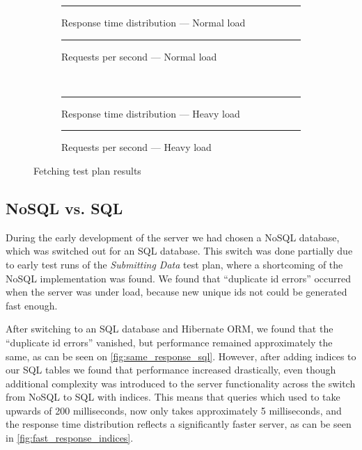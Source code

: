 \begin{figure}[!htb]
    \centering
    \begin{subfigure}[b]{0.5\textwidth}
        \centering
        \rule{5cm}{5cm}
        \caption{Response time distribution --- Normal load}\label{fig:fetch_resp_t_dist}
    \end{subfigure}\hfill%
    \begin{subfigure}[b]{0.5\textwidth}
        \centering
        \rule{5cm}{5cm}
        \caption{Requests per second --- Normal load}\label{fig:fetch_reqs_p_sec}
    \end{subfigure}\\
    \begin{subfigure}[b]{0.5\textwidth}
        \centering
        \rule{5cm}{5cm}
        \caption{Response time distribution --- Heavy load}\label{fig:fetch_resp_t_dist_heavy}
    \end{subfigure}\hfill%
    \begin{subfigure}[b]{0.5\textwidth}
        \centering
        \rule{5cm}{5cm}
        \caption{Requests per second --- Heavy load}\label{fig:fetch_reqs_p_sec_heavy}
    \end{subfigure}
    \caption{Fetching test plan results}\label{fig:fetch_test_results}
\end{figure}

\subsection{NoSQL vs. SQL}\label{subsec:nosql_vs._sql}
During the early development of the server we had chosen a NoSQL database, which was switched out for an SQL database.
This switch was done partially due to early test runs of the \textit{Submitting Data} test plan, where a shortcoming of the NoSQL implementation was found.
We found that \enquote{duplicate id errors} occurred when the server was under load, because new unique ids not could be generated fast enough.

After switching to an SQL database and Hibernate ORM, we found that the \enquote{duplicate id errors} vanished, but performance remained approximately the same, as can be seen on \cref{fig:same_response_sql}.
However, after adding indices to our SQL tables we found that performance increased drastically, even though additional complexity was introduced to the server functionality across the switch from NoSQL to SQL with indices.
This means that queries which used to take upwards of 200 milliseconds, now only takes approximately 5 milliseconds, and the response time distribution reflects a significantly faster server, as can be seen in \cref{fig:fast_response_indices}.


